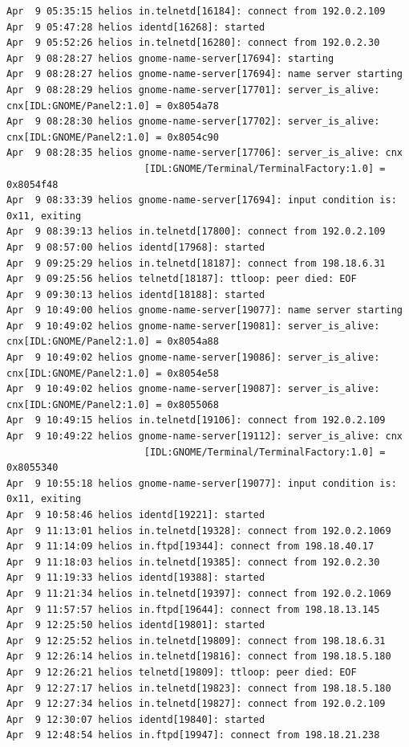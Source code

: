 \begin{lstlisting}[style=terminal]
Apr  9 05:35:15 helios in.telnetd[16184]: connect from 192.0.2.109
Apr  9 05:47:28 helios identd[16268]: started
Apr  9 05:52:26 helios in.telnetd[16280]: connect from 192.0.2.30
Apr  9 08:28:27 helios gnome-name-server[17694]: starting
Apr  9 08:28:27 helios gnome-name-server[17694]: name server starting
Apr  9 08:28:29 helios gnome-name-server[17701]: server_is_alive: cnx[IDL:GNOME/Panel2:1.0] = 0x8054a78
Apr  9 08:28:30 helios gnome-name-server[17702]: server_is_alive: cnx[IDL:GNOME/Panel2:1.0] = 0x8054c90
Apr  9 08:28:35 helios gnome-name-server[17706]: server_is_alive: cnx
                        [IDL:GNOME/Terminal/TerminalFactory:1.0] = 0x8054f48
Apr  9 08:33:39 helios gnome-name-server[17694]: input condition is: 0x11, exiting
Apr  9 08:39:13 helios in.telnetd[17800]: connect from 192.0.2.109
Apr  9 08:57:00 helios identd[17968]: started
Apr  9 09:25:29 helios in.telnetd[18187]: connect from 198.18.6.31
Apr  9 09:25:56 helios telnetd[18187]: ttloop: peer died: EOF
Apr  9 09:30:13 helios identd[18188]: started
Apr  9 10:49:00 helios gnome-name-server[19077]: name server starting
Apr  9 10:49:02 helios gnome-name-server[19081]: server_is_alive: cnx[IDL:GNOME/Panel2:1.0] = 0x8054a88
Apr  9 10:49:02 helios gnome-name-server[19086]: server_is_alive: cnx[IDL:GNOME/Panel2:1.0] = 0x8054e58
Apr  9 10:49:02 helios gnome-name-server[19087]: server_is_alive: cnx[IDL:GNOME/Panel2:1.0] = 0x8055068
Apr  9 10:49:15 helios in.telnetd[19106]: connect from 192.0.2.109
Apr  9 10:49:22 helios gnome-name-server[19112]: server_is_alive: cnx
                        [IDL:GNOME/Terminal/TerminalFactory:1.0] = 0x8055340
Apr  9 10:55:18 helios gnome-name-server[19077]: input condition is: 0x11, exiting
Apr  9 10:58:46 helios identd[19221]: started
Apr  9 11:13:01 helios in.telnetd[19328]: connect from 192.0.2.1069
Apr  9 11:14:09 helios in.ftpd[19344]: connect from 198.18.40.17
Apr  9 11:18:03 helios in.telnetd[19385]: connect from 192.0.2.30
Apr  9 11:19:33 helios identd[19388]: started
Apr  9 11:21:34 helios in.telnetd[19397]: connect from 192.0.2.1069
Apr  9 11:57:57 helios in.ftpd[19644]: connect from 198.18.13.145
Apr  9 12:25:50 helios identd[19801]: started
Apr  9 12:25:52 helios in.telnetd[19809]: connect from 198.18.6.31
Apr  9 12:26:14 helios in.telnetd[19816]: connect from 198.18.5.180
Apr  9 12:26:21 helios telnetd[19809]: ttloop: peer died: EOF
Apr  9 12:27:17 helios in.telnetd[19823]: connect from 198.18.5.180
Apr  9 12:27:34 helios in.telnetd[19827]: connect from 192.0.2.109
Apr  9 12:30:07 helios identd[19840]: started
Apr  9 12:48:54 helios in.ftpd[19947]: connect from 198.18.21.238

\end{lstlisting}
